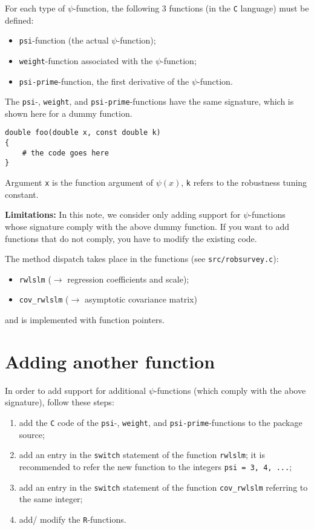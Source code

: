 \documentclass[a4paper,oneside,11pt,DIV=12]{scrartcl}
\newcommand{\code}[1]{{\texttt{#1}}}
\begin{document}
\noindent For each type of $\psi$-function, the following 3 functions (in
the \code{C} language) must be defined:
\begin{itemize}
    \item \code{psi}-function (the actual $\psi$-function);
    \item \code{weight}-function associated with the $\psi$-function;
    \item \code{psi-prime}-function, the first derivative of the
        $\psi$-function.
\end{itemize}

\noindent The \code{psi}-, \code{weight}, and \code{psi-prime}-functions
have the same signature, which is shown here for a dummy function.

\begin{verbatim}
double foo(double x, const double k)
{
    # the code goes here
}
\end{verbatim}

\noindent Argument \code{x} is the function argument of $\psi(x)$, \code{k}
refers to the robustness tuning constant.

\begin{leftbar}
\noindent \textbf{Limitations:} In this note, we consider only adding support
for $\psi$-functions whose signature comply with the above dummy function.
If you want to add functions that do not comply, you have to modify the
existing code.
\end{leftbar}

\noindent The method dispatch takes place in the functions (see
\code{src/robsurvey.c}):
\begin{itemize}
    \item \code{rwlslm} ($\rightarrow$ regression coefficients and scale);
    \item \code{cov\_rwlslm} ($\rightarrow$ asymptotic covariance
        matrix)
\end{itemize}
\noindent and is implemented with function pointers.

\section{Adding another function}
In order to add support for additional $\psi$-functions (which comply with
the above signature), follow these steps:

\begin{enumerate}[1]
    \item add the \code{C} code of the \code{psi}-, \code{weight}, and
        \code{psi-prime}-functions to the package source;
    \item add an entry in the \code{switch} statement of the function
        \code{rwlslm}; it is recommended to refer the new
        function to the integers \code{psi = 3, 4, ...};
    \item add an entry in the \code{switch} statement of the function
        \code{cov\_rwlslm} referring to the same integer;
    \item add/ modify the \code{R}-functions.
\end{enumerate}
\end{document}
